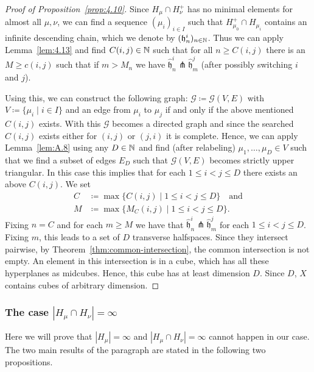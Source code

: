 \begin{proof}[Proof of Proposition~\ref{prop:4.10}]
  Since \(H_\mu \cap H_\nu^+\) has no minimal elements for almost all \(\mu, \nu\), we can find a sequence \((\mu_i)_{i \in I}\) such that \(H_{\mu_0}^+ \cap H_{\mu_i}\) contains an infinite descending chain, which we denote by \((\mathfrak{h}^i_n)_{n \in \mathbb{N}}\). Thus we can apply Lemma~\ref{lem:4.13} and find \(C(i,j) \in \mathbb{N}\) such that for all \(n \geq C(i,j)\) there is an \(M \geq c(i,j)\) such that if \(m > M_n\) we have \(\mathfrak{\hat h}_n^i \pitchfork \mathfrak{\hat h}_m^j\) (after possibly switching \(i\) and \(j\)).

  Using this, we can construct the following graph: \(\mathcal{G} \coloneqq \mathcal{G}(V,E)\) with \(V \coloneqq \{\mu_i \mid i \in I\}\) and an edge from \(\mu_i\) to \(\mu_j\) if and only if the above mentioned \(C(i,j)\) exists. With this \(\mathcal{G}\) becomes a directed graph and since the searched \(C(i,j)\) exists either for \((i,j)\) or \((j,i)\) it is complete. Hence, we can apply Lemma~\ref{lem:A.8} using any \(D \in \mathbb{N}\) and find (after relabeling) \(\mu_1, \dots, \mu_D \in V\) such that we find a subset of edges \(E_D\) such that \(\mathcal{G}(V,E)\) becomes strictly upper triangular. In this case this implies that for each \(1\leq i < j \leq D\) there exists an above \(C(i,j)\). We set
  \begin{align*}
    C &\coloneqq \max\{C(i,j) \mid 1 \leq i < j \leq D\} \quad \text{and}\\
    M &\coloneqq \max\{M_C(i,j) \mid 1 \leq i < j \leq D\}.
  \end{align*}
  Fixing \(n = C\) and for each \(m \geq M\) we have that \(\mathfrak{\hat h}_n^i \pitchfork \mathfrak{\hat h}_m^j\) for each \(1 \leq i < j \leq D\). Fixing \(m\), this leads to a set of \(D\) transverse halfspaces. Since they intersect pairwise,  by Theorem~\ref{thm:common-intersection}, the common intersection is not empty. An element in this intersection is in a cube, which has all these hyperplanes as midcubes. Hence, this cube has at least dimension \(D\). Since \(D\), \(X\) contains cubes of arbitrary dimension.
\end{proof}

\subsubsection{The case \(|H_\mu \cap H_\nu| = \infty\)}
\label{sec:M=infty}

Here we will prove that \(|H_\mu| = \infty\) and \(|H_\mu \cap H_\nu| = \infty\) cannot happen in our case. The two main results of the paragraph are stated in the following two propositions.

